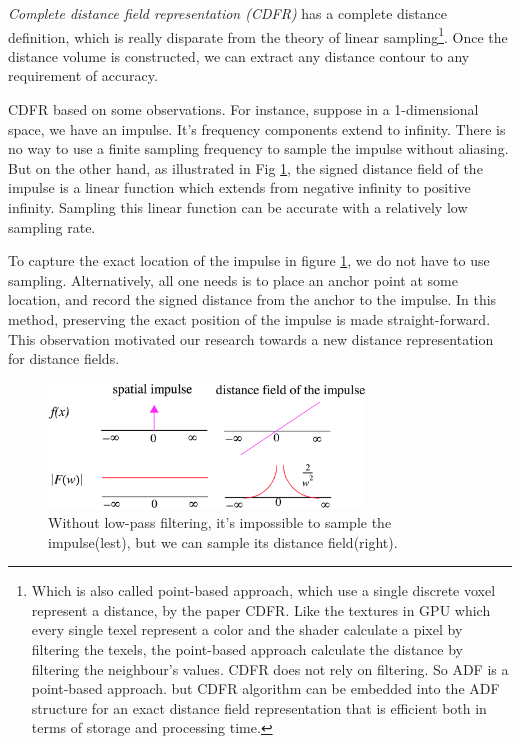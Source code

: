 \textit{Complete distance field representation (CDFR)}\cite{a:A-Complete-Distance-Field-Representation} has a complete distance definition, which is really disparate from the theory of linear sampling\footnote{Which is also called point-based approach, which use a single discrete voxel represent a distance, by the paper CDFR. Like the textures in GPU which every single texel represent a color and the shader calculate a pixel by filtering the texels, the point-based approach calculate the distance by filtering the neighbour's values. CDFR does not rely on filtering. So ADF is a point-based approach. but CDFR algorithm can be embedded into the ADF structure for an exact distance field representation that is efficient both in terms of storage and processing time.}. Once the distance volume is constructed, we can extract any distance contour to any requirement of accuracy. 

CDFR based on some observations. For instance, suppose in a 1-dimensional space, we have an impulse. It’s frequency components extend to infinity. There is no way to use a finite sampling frequency to sample the impulse without aliasing. But on the other hand, as illustrated in Fig \ref{f:1-dimension-space}, the signed distance field of the impulse is a linear function which extends from negative infinity to positive infinity. Sampling this linear function can be accurate with a relatively low sampling rate.

To capture the exact location of the impulse in figure \ref{f:1-dimension-space}, we do not have to use sampling. Alternatively, all one needs is to place an anchor point at some location, and record the signed distance from the anchor to the impulse. In this method, preserving the exact position of the impulse is made straight-forward. This observation motivated our research towards a new distance representation for distance fields.

\begin{figure}
	\begin{center}
		\includegraphics[width=0.75\textwidth]{graphics/df/1-dimension-space}
	\end{center}
	\caption{Without low-pass filtering, it's impossible to sample the impulse(lest), but we can sample its distance field(right).}
	\label{f:1-dimension-space}
\end{figure}

